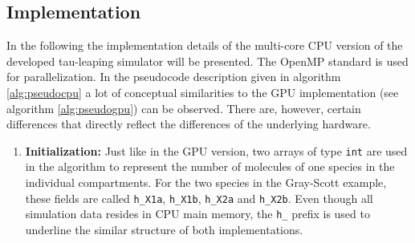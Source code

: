 \subsection{Implementation}
In the following the implementation details of the multi-core CPU version of the developed tau-leaping simulator will be presented. The OpenMP standard is used for parallelization. In the pseudocode description given in algorithm \ref{alg:pseudocpu} a lot of conceptual similarities to the GPU implementation (see algorithm \ref{alg:pseudogpu}) can be observed. There are, however, certain differences that directly reflect the differences of the underlying hardware. 

\begin{enumerate}
\item \textbf{Initialization:} Just like in the GPU version, two arrays of type \texttt{int} are used in the algorithm to represent the number of molecules of one species in the individual compartments. For the two species in the Gray-Scott example, these fields are called \texttt{h\_X1a}, \texttt{h\_X1b}, \texttt{h\_X2a} and \texttt{h\_X2b}. Even though all simulation data resides in CPU main memory, the \texttt{h\_} prefix is used to underline the similar structure of both implementations. 


\end{enumerate}
